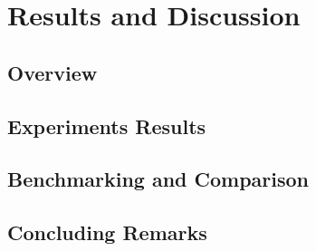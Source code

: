 

\chapter{Results and Discussion}\label{chapter:results}

\section{Overview}
\section{Experiments Results}
\section{Benchmarking and Comparison}
\section{Concluding Remarks}





